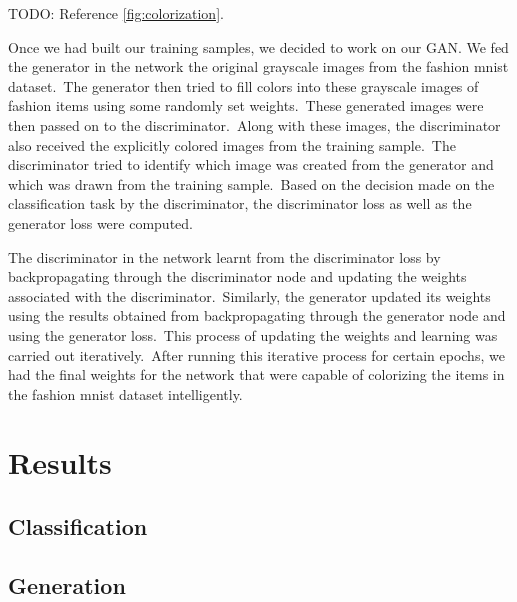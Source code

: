 \documentclass[conference]{IEEEtran}
\begin{document}
    TODO: Reference \autoref{fig:colorization}.

    Once we had built our training samples, we decided to work on our GAN. We fed the generator in the network the original grayscale images from the fashion mnist dataset.\ The generator then tried to fill colors into these grayscale images of fashion items using some randomly set weights.\ These generated images were then passed on to the discriminator.\ Along with these images, the discriminator also received the explicitly colored images from the training sample.\ The discriminator tried to identify which image was created from the generator and which was drawn from the training sample.\ Based on the decision made on the classification task by the discriminator, the discriminator loss as well as the generator loss were computed.

    The discriminator in the network learnt from the discriminator loss by backpropagating through the discriminator node and updating the weights associated with the discriminator.\ Similarly, the generator updated its weights using the results obtained from backpropagating through the generator node and using the generator loss.\ This process of updating the weights and learning was carried out iteratively.\ After running this iterative process for certain epochs, we had the final weights for the network that were capable of colorizing the items in the fashion mnist dataset intelligently.

    \section{Results}\label{sec:results}

    \subsection{Classification}\label{subsec:results-classification}

    \subsection{Generation}\label{subsec:results-generation}
\end{document}

